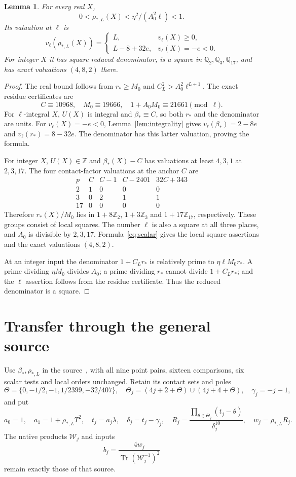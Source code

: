 \documentclass[11pt,a4paper]{article}
\newtheorem{lemma}[theorem]{Lemma}
\newcommand{\Q}{\mathbb Q}\newcommand{\Z}{\mathbb Z}
\DeclareMathOperator{\Tr}{Tr}\DeclareMathOperator{\Nm}{N}
\begin{document}
\begin{lemma}\label{lem:preparation}
For every real $X$,
\[
                0<\rho_{*,L}(X)<\eta^2/(A_0^2\ell)<1.
\]
Its valuation at $\ell$ is
\[
 v_\ell(\rho_{*,L}(X))=
 \begin{cases}
 L,&v_\ell(X)\ge0,\\
 L-8+32e,&v_\ell(X)=-e<0.
 \end{cases}
\]
For integer $X$ it has square reduced denominator, is a square in
$\Q_2,\Q_3,\Q_{17}$, and has exact valuations $(4,8,2)$ there.
\end{lemma}
\begin{proof}
The real bound follows from $r_*\ge M_0$ and
$C_L^2>A_0^2\ell^{L+1}$.
The exact residue certificates are
\[
 C\equiv10968,\quad M_0\equiv19666,\quad
 1+A_0M_0\equiv21661\pmod\ell.
\]
For $\ell$-integral $X$, $U(X)$ is integral and $\beta_*\equiv C$,
so both $r_*$ and the denominator are units. For
$v_\ell(X)=-e<0$, Lemma~\ref{lem:integrality} gives
$v_\ell(\beta_*)=2-8e$ and $v_\ell(r_*)=8-32e$.
The denominator has this latter valuation, proving the formula.

For integer $X$, $U(X)\in\Z$ and $\beta_*(X)-C$ has valuations
at least $4,3,1$ at $2,3,17$. The four contact-factor valuations at
the anchor $C$ are
\[
\begin{array}{c|rrrr}
 p&C&C-1&C-2401&32C+343\\\hline
 2&1&0&0&0\\
 3&0&2&1&1\\
 17&0&0&0&0
\end{array}
\]
Therefore $r_*(X)/M_0$ lies in $1+8\Z_2$, $1+3\Z_3$ and
$1+17\Z_{17}$, respectively. These groups consist of local squares.
The number $\ell$ is also a square at all three places, and
$A_0$ is divisible by $2,3,17$. Formula~\eqref{eq:scalar} gives the
local square assertions and the exact valuations $(4,8,2)$.

At an integer input the denominator $1+C_Lr_*$ is relatively prime
to $\eta\ell M_0r_*$. A prime dividing $\eta M_0$ divides $A_0$;
a prime dividing $r_*$ cannot divide $1+C_Lr_*$; and the
$\ell$ assertion follows from the residue certificate. Thus the
reduced denominator is a square.
\end{proof}

\section{Transfer through the general source}
Use $\beta_*,\rho_{*,L}$ in the source~\cite{UnitNorm}, with all
nine point pairs, sixteen comparisons, six scalar tests and local
orders unchanged. Retain its contact sets and poles
\[
 \Theta=\{0,-1/2,-1,1/2399,-32/407\},\quad
 \Theta_j=(4j+2+\Theta)\cup(4j+4+\Theta),\quad \gamma_j=-j-1,
\]
and put
\[
 a_0=1,\quad a_1=1+\rho_{*,L}T^2,\quad t_j=a_j\lambda,\quad
 \delta_j=t_j-\gamma_j,\quad
 R_j=\frac{\prod_{\theta\in\Theta_j}(t_j-\theta)}{\delta_j^{10}},
 \quad w_j=\rho_{*,L}R_j.
\]
The native products $\mathcal W_j$ and inputs
\begin{equation}\label{eq:native}
 b_j=\frac{4w_j}{\Tr(\mathcal W_j^{-1})^2}
\end{equation}
remain exactly those of that source.
\end{document}
